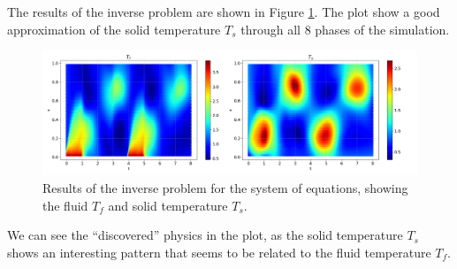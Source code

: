 \documentclass[unicode,11pt,a4paper,oneside,numbers=endperiod,openany]{scrartcl}
\begin{document}
The results of the inverse problem are shown in Figure \ref{fig:task2}. The plot
show a good approximation of the solid temperature $T_s$ through all 8 phases of
the simulation.
\begin{figure}[h]
    \centering
    \includegraphics[width=\textwidth]{../Proj1_Y24/Task2/output.png}
    \caption{Results of the inverse problem for the system of equations, showing the fluid  $T_f$ and solid temperature $T_s$.}
    \label{fig:task2}
\end{figure}
We can see the ``discovered'' physics in the plot, as the solid temperature
$T_s$
shows an interesting pattern that seems to be related to the fluid temperature
$T_f$.
\end{document}
